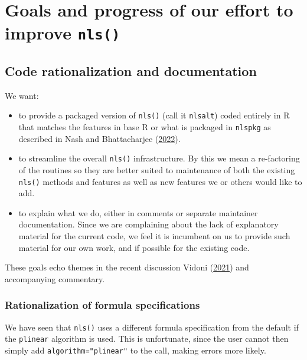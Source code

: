 \documentclass[
]{article}
\begin{document}
\hypertarget{goals-and-progress-of-our-effort-to-improve-nls}{%
\section{\texorpdfstring{Goals and progress of our effort to improve
\texttt{nls()}}{Goals and progress of our effort to improve nls()}}\label{goals-and-progress-of-our-effort-to-improve-nls}}

\hypertarget{code-rationalization-and-documentation}{%
\subsection{Code rationalization and
documentation}\label{code-rationalization-and-documentation}}

We want:

\begin{itemize}
\item
  to provide a packaged version of \texttt{nls()} (call it
  \texttt{nlsalt}) coded entirely in R that matches the features in base
  R or what is packaged in \texttt{nlspkg} as described in Nash and
  Bhattacharjee (\protect\hyperlink{ref-PkgFromRbase22}{2022}).
\item
  to streamline the overall \texttt{nls()} infrastructure. By this we
  mean a re-factoring of the routines so they are better suited to
  maintenance of both the existing \texttt{nls()} methods and features
  as well as new features we or others would like to add.
\item
  to explain what we do, either in comments or separate maintainer
  documentation. Since we are complaining about the lack of explanatory
  material for the current code, we feel it is incumbent on us to
  provide such material for our own work, and if possible for the
  existing code.
\end{itemize}

These goals echo themes in the recent discussion Vidoni
(\protect\hyperlink{ref-Vidoni21}{2021}) and accompanying commentary.

\hypertarget{rationalization-of-formula-specifications}{%
\subsubsection{Rationalization of formula
specifications}\label{rationalization-of-formula-specifications}}

We have seen that \texttt{nls()} uses a different formula specification
from the default if the \texttt{plinear} algorithm is used. This is
unfortunate, since the user cannot then simply add
\texttt{algorithm="plinear"} to the call, making errors more likely.
\end{document}
